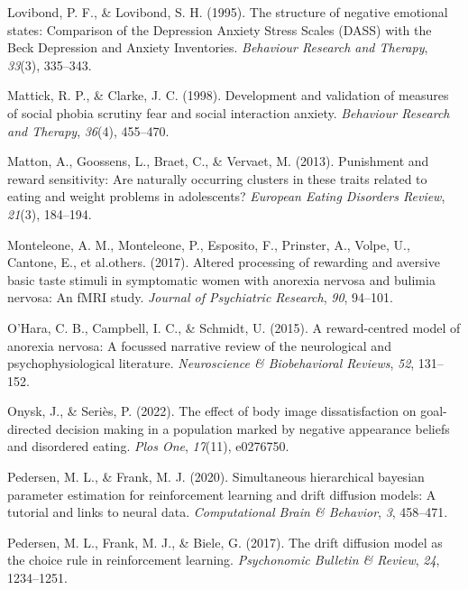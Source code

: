 \documentclass[
  man,floatsintext]{apa6}
\newlength{\cslhangindent}
\newlength{\cslentryspacingunit} %
\newenvironment{CSLReferences}[2] %
 {%
  \setlength{\parindent}{0pt}
  \ifodd #1
  \let\oldpar\par
  \def\par{\hangindent=\cslhangindent\oldpar}
  \fi
  \setlength{\parskip}{#2\cslentryspacingunit}
 }%
 {}
\begin{document}
\begin{CSLReferences}{1}{0}
\leavevmode{}%
Lovibond, P. F., \& Lovibond, S. H. (1995). {The structure of negative emotional states: Comparison of the Depression Anxiety Stress Scales (DASS) with the Beck Depression and Anxiety Inventories}. \emph{Behaviour Research and Therapy}, \emph{33}(3), 335--343.

\leavevmode{}%
Mattick, R. P., \& Clarke, J. C. (1998). Development and validation of measures of social phobia scrutiny fear and social interaction anxiety. \emph{Behaviour Research and Therapy}, \emph{36}(4), 455--470.

\leavevmode{}%
Matton, A., Goossens, L., Braet, C., \& Vervaet, M. (2013). Punishment and reward sensitivity: Are naturally occurring clusters in these traits related to eating and weight problems in adolescents? \emph{European Eating Disorders Review}, \emph{21}(3), 184--194.

\leavevmode{}%
Monteleone, A. M., Monteleone, P., Esposito, F., Prinster, A., Volpe, U., Cantone, E., et al.others. (2017). Altered processing of rewarding and aversive basic taste stimuli in symptomatic women with anorexia nervosa and bulimia nervosa: An fMRI study. \emph{Journal of Psychiatric Research}, \emph{90}, 94--101.

\leavevmode{}%
O'Hara, C. B., Campbell, I. C., \& Schmidt, U. (2015). A reward-centred model of anorexia nervosa: A focussed narrative review of the neurological and psychophysiological literature. \emph{Neuroscience \& Biobehavioral Reviews}, \emph{52}, 131--152.

\leavevmode{}%
Onysk, J., \& Seriès, P. (2022). The effect of body image dissatisfaction on goal-directed decision making in a population marked by negative appearance beliefs and disordered eating. \emph{Plos One}, \emph{17}(11), e0276750.

\leavevmode{}%
Pedersen, M. L., \& Frank, M. J. (2020). Simultaneous hierarchical bayesian parameter estimation for reinforcement learning and drift diffusion models: A tutorial and links to neural data. \emph{Computational Brain \& Behavior}, \emph{3}, 458--471.

\leavevmode{}%
Pedersen, M. L., Frank, M. J., \& Biele, G. (2017). The drift diffusion model as the choice rule in reinforcement learning. \emph{Psychonomic Bulletin \& Review}, \emph{24}, 1234--1251.


\end{CSLReferences}
\end{document}
